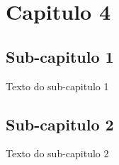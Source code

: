 
\chapter{Capitulo 4}
\section{Sub-capitulo 1}
Texto do sub-capitulo 1
\section{Sub-capitulo 2}
Texto do sub-capitulo 2